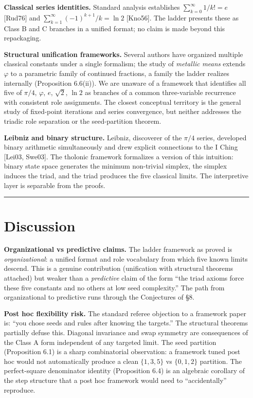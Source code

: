 \documentclass[12pt]{article}
\begin{document}
\textbf{Classical series identities.} Standard analysis establishes
\(\sum_{k=0}^\infty 1/k! = e\) {[}Rud76{]} and
\(\sum_{k=1}^\infty (-1)^{k+1}/k = \ln 2\) {[}Kno56{]}. The ladder
presents these as Class B and C branches in a unified format; no claim
is made beyond this repackaging.

\textbf{Structural unification frameworks.} Several authors have
organized multiple classical constants under a single formalism; the
study of \emph{metallic means} extends \(\varphi\) to a parametric
family of continued fractions, a family the ladder realizes internally
(Proposition 6.6(ii)). We are unaware of a framework that identifies all
five of \(\pi/4\), \(\varphi\), \(e\), \(\sqrt{2}\), \(\ln 2\) as
branches of a common three-variable recurrence with consistent role
assignments. The closest conceptual territory is the general study of
fixed-point iterations and series convergence, but neither addresses the
triadic role separation or the seed-partition theorem.

\textbf{Leibniz and binary structure.} Leibniz, discoverer of the
\(\pi/4\) series, developed binary arithmetic simultaneously and drew
explicit connections to the I Ching {[}Lei03, Swe03{]}. The tholonic
framework formalizes a version of this intuition: binary state space
generates the minimum non-trivial simplex, the simplex induces the
triad, and the triad produces the five classical limits. The
interpretive layer is separable from the proofs.

\begin{center}\rule{0.5\linewidth}{0.5pt}\end{center}

\section{Discussion}\label{discussion}

\textbf{Organizational vs predictive claims.} The ladder framework as
proved is \emph{organizational}: a unified format and role vocabulary
from which five known limits descend. This is a genuine contribution
(unification with structural theorems attached) but weaker than a
\emph{predictive} claim of the form ``the triad axioms force these five
constants and no others at low seed complexity.'' The path from
organizational to predictive runs through the Conjectures of §8.

\textbf{Post hoc flexibility risk.} The standard referee objection to a
framework paper is: ``you chose seeds and rules after knowing the
targets.'' The structural theorems partially defuse this. Diagonal
invariance and swap symmetry are consequences of the Class A form
independent of any targeted limit. The seed partition (Proposition 6.1)
is a sharp combinatorial observation: a framework tuned post hoc would
not automatically produce a clean \(\{1,3,5\}\) vs \(\{0,1,2\}\)
partition. The perfect-square denominator identity (Proposition 6.4) is
an algebraic corollary of the step structure that a post hoc framework
would need to ``accidentally'' reproduce.
\end{document}

